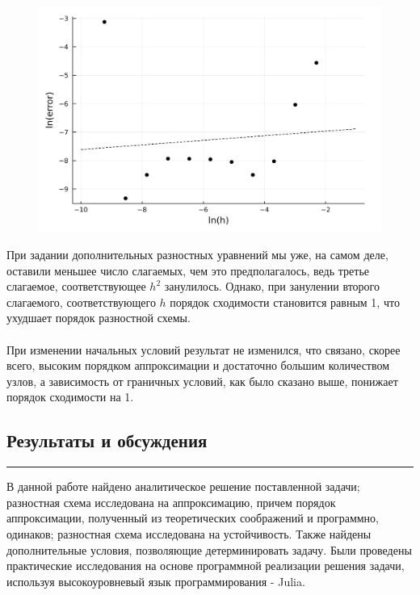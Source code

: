 \documentclass[12pt,a4paper, titlepage]{article}
\begin{document}
\begin{figure}[H]
	\centering
	\includegraphics[width = 1.0\textwidth]{lab4_3.png}
\end{figure}
При задании дополнительных разностных уравнений мы уже, на самом деле, оставили меньшее число слагаемых, чем это предполагалось, ведь третье слагаемое, соответствующее $h^2$ занулилось. Однако, при занулении второго слагаемого, соответствующего $h$ порядок сходимости становится равным 1, что ухудшает порядок разностной схемы.
\\
\\
При изменении начальных условий результат не изменился, что связано, скорее всего, высоким порядком аппроксимации и достаточно большим количеством узлов, а зависимость от граничных условий, как было сказано выше, понижает порядок сходимости на 1.
\subsection*{Результаты и обсуждения}
\noindent\rule{\textwidth}{1pt}
В данной работе найдено аналитическое решение поставленной задачи; разностная схема исследована на аппроксимацию, причем порядок аппроксимации, полученный из теоретических соображений и программно, одинаков; разностная схема исследована на устойчивость. Также найдены дополнительные условия, позволяющие детерминировать задачу. Были проведены практические исследования на основе программной реализации решения задачи, используя высокоуровневый язык программирования - Julia.
\end{document}
